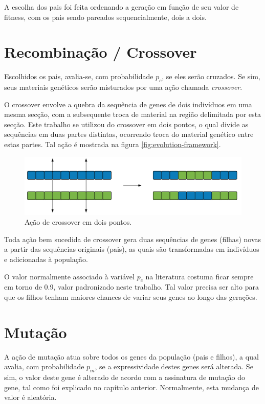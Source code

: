 A escolha dos pais foi feita ordenando a geração em função de seu valor de fitness, com os pais sendo pareados sequencialmente, dois a dois.

\section{Recombinação / Crossover}

Escolhidos os pais, avalia-se, com probabilidade $p_c$, se eles serão cruzados. Se sim, seus materiais genéticos serão misturados por uma ação chamada \emph{crossover}.

O crossover envolve a quebra da sequência de genes de dois indivíduos em uma mesma secção, com a subsequente troca de material na região delimitada por esta secção. Este trabalho se utilizou do crossover em dois pontos, o qual divide as sequências em duas partes distintas, ocorrendo troca do material genético entre estas partes. Tal ação é mostrada na figura \ref{fig:evolution-framework}.

\begin{figure}[ht!]
    \centering \includegraphics[width=1.0\textwidth]{crossover.png}
    \caption{Ação de crossover em dois pontos.}
    \label{fig:crossover}
\end{figure}

Toda ação bem sucedida de crossover gera duas sequências de genes (filhas) novas a partir das sequências originais (pais), as quais são transformadas em indivíduos e adicionadas à população.

O valor normalmente associado à variável $p_c$ na literatura costuma ficar sempre em torno de 0.9, valor padronizado neste trabalho. Tal valor precisa ser alto para que os filhos tenham maiores chances de variar seus genes ao longo das gerações.

\section{Mutação}

A ação de mutação atua sobre todos os genes da população (pais e filhos), a qual avalia, com probabilidade $p_m$, se a expressividade destes genes será alterada. Se sim, o valor deste gene é alterado de acordo com a assinatura de mutação do gene, tal como foi explicado no capítulo anterior. Normalmente, esta mudança de valor é aleatória.

